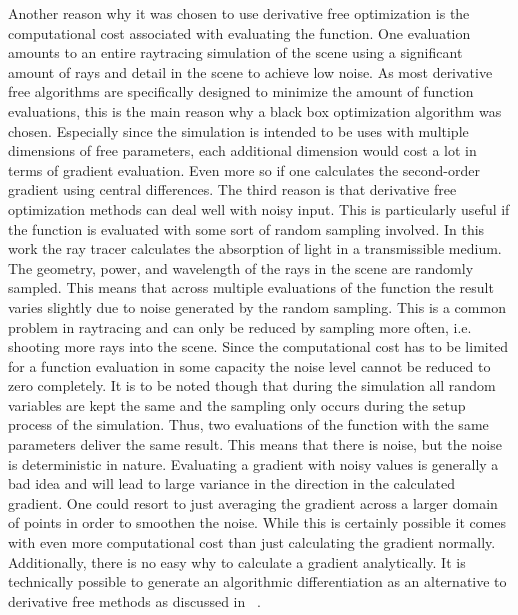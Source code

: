\documentclass[a4paper,10pt]{article}
\begin{document}
    Another reason why it was chosen to use derivative free optimization
    is the computational cost associated with evaluating the function.
    One evaluation amounts to an entire raytracing simulation of the
    scene using a significant amount of rays and detail in the scene
    to achieve low noise.
    As most derivative free algorithms are specifically designed to
    minimize the amount of function evaluations, this is the
    main reason why a black box optimization algorithm was chosen.
    Especially since the simulation is intended to be uses with multiple
    dimensions of free parameters, each additional dimension would
    cost a lot in terms of gradient evaluation.
    Even more so if one calculates the second-order gradient using
    central differences.
    The third reason is that derivative free optimization methods
    can deal well with noisy input.
    This is particularly useful if the function is evaluated
    with some sort of random sampling involved.
    In this work the ray tracer calculates the absorption of light in a
    transmissible medium.
    The geometry, power, and wavelength of the rays in the scene are
    randomly sampled.
    This means that across multiple evaluations of the function the
    result varies slightly due to noise generated by the random sampling.
    This is a common problem in raytracing and can only be reduced by
    sampling more often, i.e. shooting more rays into the scene.
    Since the computational cost has to be limited for a function
    evaluation in some capacity the noise level cannot be reduced
    to zero completely.
    It is to be noted though that during the simulation all
    random variables are kept the same and the sampling only
    occurs during the setup process of the simulation.
    Thus, two evaluations of the function with the same parameters
    deliver the same result.
    This means that there is noise, but the noise is deterministic
    in nature.
    Evaluating a gradient with noisy values is generally a bad idea
    and will lead to large variance in the direction in the 
    calculated gradient.
    One could resort to just averaging the gradient across a
    larger domain of points in order to smoothen the noise.
    While this is certainly possible it comes with even more
    computational cost than just calculating the gradient normally.
    Additionally, there is no easy why to calculate a gradient
    analytically.
    It is technically possible to generate an algorithmic
    differentiation as an alternative to derivative free 
    methods as discussed in ~\cite{derivative_free_methods}.
\end{document}
